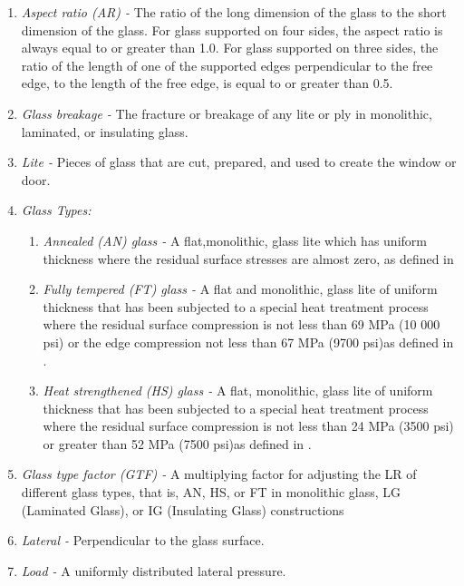 \documentclass[12pt]{article}
\begin{document}
\begin{enumerate}
\item \textit{Aspect ratio (AR) -} The ratio of the long dimension of the
  glass to the short dimension of the glass.  For glass supported on four sides,
  the aspect ratio is always equal to or greater than 1.0. For glass supported
  on three sides, the ratio of the length of one of the supported edges
  perpendicular to the free edge, to the length of the free edge, is equal to or
  greater than 0.5.

\item \textit{Glass breakage -} The fracture or breakage of any lite or ply in
  monolithic, laminated, or insulating glass.
    \item \textit{Lite -} Pieces of glass that are cut, prepared, and used to create the window or door. 
\item \textit{Glass Types:}
\begin{enumerate}
\item \textit{Annealed (AN) glass -} A flat,monolithic, glass lite which has uniform 
thickness where the residual surface stresses are almost zero, as defined in 
\cite{C1036}
\item \textit{Fully tempered (FT) glass -} A flat and monolithic, glass lite of 
uniform thickness that has been subjected to a special heat treatment process 
where the residual surface compression is not less than 69 MPa (10 000 psi) or 
the edge compression not less than 67 MPa (9700 psi)as defined in \cite{C1048}.

\item \textit{Heat strengthened (HS) glass -} A flat, monolithic, glass lite of 
uniform thickness that has been subjected to a special heat treatment process 
where the residual surface compression is not less than 24 MPa (3500 psi) or 
greater than 52 MPa (7500 psi)as defined in \cite{C1048}.

\end{enumerate}
  
\item \textit{Glass type factor (GTF) -} A multiplying factor for adjusting the 
LR of different glass types, that is, AN, HS, or FT in monolithic glass, LG
(Laminated Glass), or IG (Insulating Glass) constructions
\item \textit{Lateral -} Perpendicular to the glass surface.
\item \textit{Load -} A uniformly distributed lateral pressure.


\end{enumerate}
\end{document}
